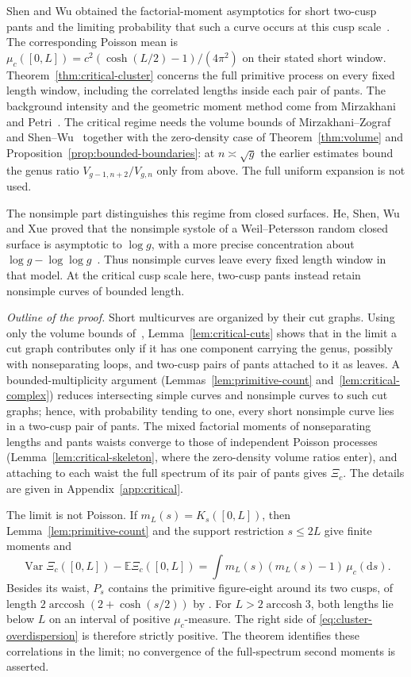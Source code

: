 Shen and Wu obtained the factorial-moment asymptotics for short
two-cusp pants and the limiting probability that such a curve occurs
at this cusp scale~\cite[Lemmas~28 and~33]{SW}. The corresponding Poisson mean is
$\mu_c([0,L])=c^2(\cosh(L/2)-1)/(4\pi^2)$ on their stated short
window. Theorem~\ref{thm:critical-cluster} concerns the full primitive
process on every fixed length window, including the correlated lengths
inside each pair of pants. The background intensity and the geometric
moment method come from Mirzakhani and Petri~\cite{MP}. The critical
regime needs the volume bounds of Mirzakhani--Zograf and
Shen--Wu~\cite{MZ,SW} together with the zero-density case of
Theorem~\ref{thm:volume} and Proposition~\ref{prop:bounded-boundaries}:
at $n\asymp\sqrt g$ the earlier estimates bound the genus ratio
$V_{g-1,n+2}/V_{g,n}$ only from above. The full uniform expansion is not
used.

The nonsimple part distinguishes this regime from closed surfaces.
He, Shen, Wu and Xue proved that the nonsimple systole of a
Weil--Petersson random closed surface is asymptotic to $\log g$,
with a more precise concentration about $\log g-\log\log g$~\cite[Theorem~1.1]{HSWX}.
Thus nonsimple curves leave every
fixed length window in that model. At the critical cusp scale here,
two-cusp pants instead retain nonsimple curves of bounded length.

\emph{Outline of the proof.} Short multicurves are organized by their cut
graphs. Using only the volume bounds of~\cite{MZ,SW},
Lemma~\ref{lem:critical-cuts} shows that in the limit a cut graph
contributes only if it has one component carrying the genus, possibly
with nonseparating loops, and two-cusp pairs of pants attached to it as
leaves. A bounded-multiplicity argument (Lemmas~\ref{lem:primitive-count}
and~\ref{lem:critical-complex}) reduces intersecting simple curves and
nonsimple curves to such cut graphs; hence, with probability tending to
one, every short nonsimple curve lies in a two-cusp pair of pants. The mixed
factorial moments of nonseparating lengths and pants waists converge to those
of independent Poisson processes (Lemma~\ref{lem:critical-skeleton}, where the
zero-density volume ratios enter), and attaching to each waist the full
spectrum of its pair of pants gives $\Xi_c$. The details are given in
Appendix~\ref{app:critical}.

The limit is not Poisson. If $m_L(s)=K_s([0,L])$, then
Lemma~\ref{lem:primitive-count} and the support restriction $s\le2L$
give finite moments and
\begin{equation}
 \operatorname{Var}\Xi_c([0,L])-\mathbb E\Xi_c([0,L])
 =\int m_L(s)(m_L(s)-1)\,\mu_c(\mathrm ds).
 \label{eq:cluster-overdispersion}
\end{equation}
Besides its waist, $P_s$ contains the primitive figure-eight around
its two cusps, of length $2\operatorname{arccosh}(2+\cosh(s/2))$
by \cite[Theorem~1.3]{Rivin}. For $L>2\operatorname{arccosh}3$,
both lengths lie below $L$ on an interval of positive $\mu_c$-measure.
The right side of \eqref{eq:cluster-overdispersion} is therefore
strictly positive. The theorem identifies these correlations in the
limit; no convergence of the full-spectrum second moments is asserted.
